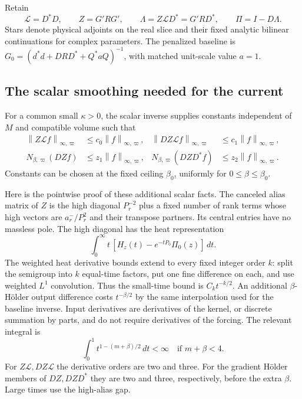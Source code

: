 \documentclass[11pt]{article}
\newcommand{\norm}[1]{\left\lVert#1\right\rVert}
\begin{document}
Retain
\begin{equation}\label{pc-scalar-data}
 \mathcal L=D^*D,\qquad Z=G'RG',\qquad
 \Lambda=Z\mathcal L D^*=G'RD^*,\qquad \Pi=I-D\Lambda.
\end{equation}
Stars denote physical adjoints on the real slice and their fixed
analytic bilinear continuations for complex parameters. The
penalized baseline is
$G_0=(d^*d+DRD^*+Q^*aQ)^{-1}$, with matched unit-scale value $a=1$.

\subsection{The scalar smoothing needed for the current}

For a common small $\kappa>0$, the scalar inverse supplies constants
independent of $M$ and compatible volume such that
\begin{align}
 \norm{Z\mathcal L f}_{\infty,\varpi}
       &\le c_0\norm{f}_{\infty,\varpi},&
 \norm{DZ\mathcal L f}_{\infty,\varpi}
       &\le c_1\norm{f}_{\infty,\varpi},
       \label{pc-scalar-bounded}\\
 N_{\beta,\varpi}(DZf)
       &\le z_1\norm{f}_{\infty,\varpi},&
 N_{\beta,\varpi}(DZD^*f)
       &\le z_2\norm{f}_{\infty,\varpi}.
       \label{pc-scalar-holder}
\end{align}
Constants can be chosen at the fixed ceiling $\beta_0$, uniformly
for $0\le\beta\le\beta_0$.

Here is the pointwise proof of these additional scalar facts. The
canceled alias matrix of $Z$ is the high diagonal $P_r^{-2}$ plus
a fixed number of rank terms whose high vectors are $a_r^-/P_r^2$
and their transpose partners. Its central entries have no massless
pole. The high diagonal has the heat representation
\begin{equation}\label{pc-biharmonic-heat}
 \int_0^\infty t\,[H_z(t)-e^{-tP_0}\Pi_0(z)]\,dt.
\end{equation}
The weighted heat derivative bounds extend to every fixed integer
order $k$: split the semigroup into $k$ equal-time factors, put one
fine difference on each, and use weighted $L^1$ convolution.
Thus the small-time bound is $C_kt^{-k/2}$. An additional
$\beta$-H\"older output difference costs $t^{-\beta/2}$ by the
same interpolation used for the baseline inverse. Input derivatives
are derivatives of the kernel, or discrete summation by parts, and
do not require derivatives of the forcing. The relevant integral is
\[
 \int_0^1 t^{1-(m+\beta)/2}\,dt<\infty
                  \quad\text{if }m+\beta<4.
\]
For $Z\mathcal L,DZ\mathcal L$ the derivative orders are two and
three. For the gradient H\"older members of $DZ,DZD^*$ they are
two and three, respectively, before the extra $\beta$. Large times
use the high-alias gap.
\end{document}
